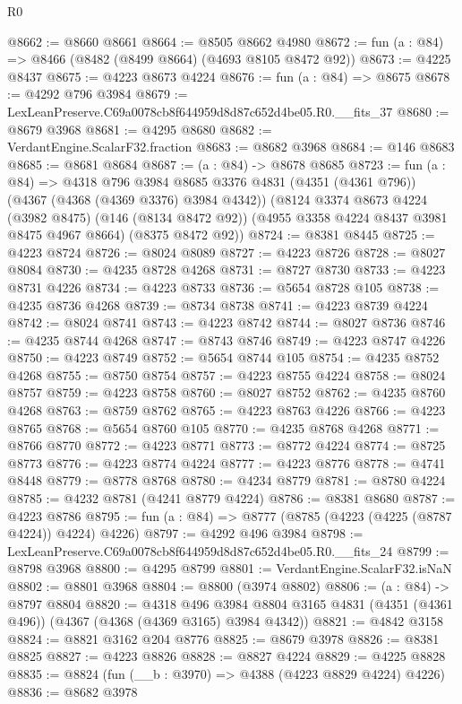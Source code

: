 \begin{lexlean}{R0}
\begin{coremodule}
@8662 := @8660 @8661
@8664 := @8505 @8662 @4980
@8672 := fun (a : @84) => @8466 (@8482 (@8499 @8664) (@4693 @8105 @8472 @92))
@8673 := @4225 @8437
@8675 := @4223 @8673 @4224
@8676 := fun (a : @84) => @8675
@8678 := @4292 @796 @3984
@8679 := LexLeanPreserve.C69a0078cb8f644959d8d87c652d4be05.R0.__fits_37
@8680 := @8679 @3968
@8681 := @4295 @8680
@8682 := VerdantEngine.ScalarF32.fraction
@8683 := @8682 @3968
@8684 := @146 @8683
@8685 := @8681 @8684
@8687 := (a : @84) -> @8678 @8685
@8723 := fun (a : @84) =>
  @4318
    @796
    @3984
    @8685
    @3376
    @4831
    (@4351 (@4361 @796))
    (@4367 (@4368 (@4369 @3376) @3984 @4342))
    (@8124
      @3374
      @8673
      @4224
      (@3982 @8475)
      (@146 (@8134 @8472 @92))
      (@4955 @3358 @4224 @8437 @3981 @8475 @4967 @8664)
      (@8375 @8472 @92))
@8724 := @8381 @8445
@8725 := @4223 @8724
@8726 := @8024 @8089
@8727 := @4223 @8726
@8728 := @8027 @8084
@8730 := @4235 @8728 @4268
@8731 := @8727 @8730
@8733 := @4223 @8731 @4226
@8734 := @4223 @8733
@8736 := @5654 @8728 @105
@8738 := @4235 @8736 @4268
@8739 := @8734 @8738
@8741 := @4223 @8739 @4224
@8742 := @8024 @8741
@8743 := @4223 @8742
@8744 := @8027 @8736
@8746 := @4235 @8744 @4268
@8747 := @8743 @8746
@8749 := @4223 @8747 @4226
@8750 := @4223 @8749
@8752 := @5654 @8744 @105
@8754 := @4235 @8752 @4268
@8755 := @8750 @8754
@8757 := @4223 @8755 @4224
@8758 := @8024 @8757
@8759 := @4223 @8758
@8760 := @8027 @8752
@8762 := @4235 @8760 @4268
@8763 := @8759 @8762
@8765 := @4223 @8763 @4226
@8766 := @4223 @8765
@8768 := @5654 @8760 @105
@8770 := @4235 @8768 @4268
@8771 := @8766 @8770
@8772 := @4223 @8771
@8773 := @8772 @4224
@8774 := @8725 @8773
@8776 := @4223 @8774 @4224
@8777 := @4223 @8776
@8778 := @4741 @8448
@8779 := @8778 @8768
@8780 := @4234 @8779
@8781 := @8780 @4224
@8785 := @4232 @8781 (@4241 @8779 @4224)
@8786 := @8381 @8680
@8787 := @4223 @8786
@8795 := fun (a : @84) => @8777 (@8785 (@4223 (@4225 (@8787 @4224)) @4224) @4226)
@8797 := @4292 @496 @3984
@8798 := LexLeanPreserve.C69a0078cb8f644959d8d87c652d4be05.R0.__fits_24
@8799 := @8798 @3968
@8800 := @4295 @8799
@8801 := VerdantEngine.ScalarF32.isNaN
@8802 := @8801 @3968
@8804 := @8800 (@3974 @8802)
@8806 := (a : @84) -> @8797 @8804
@8820 := @4318
    @496
    @3984
    @8804
    @3165
    @4831
    (@4351 (@4361 @496))
    (@4367 (@4368 (@4369 @3165) @3984 @4342))
@8821 := @4842 @3158
@8824 := @8821 @3162 @204 @8776
@8825 := @8679 @3978
@8826 := @8381 @8825
@8827 := @4223 @8826
@8828 := @8827 @4224
@8829 := @4225 @8828
@8835 := @8824 (fun (__b : @3970) => @4388 (@4223 @8829 @4224) @4226)
@8836 := @8682 @3978

\end{coremodule}
\end{lexlean}
